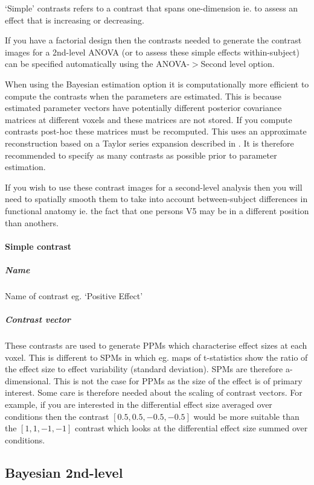 `Simple' contrasts refers to a contrast that spans one-dimension ie. to assess an effect that is increasing or decreasing.

If you have a factorial design then the contrasts needed to generate the contrast images for a 2nd-level ANOVA (or to assess these simple effects within-subject) can be specified automatically using the ANOVA-$>$Second level option.

When using the Bayesian estimation option it is computationally more efficient to compute the contrasts when the parameters are estimated. This is because estimated parameter vectors have potentially different posterior covariance matrices at different voxels and these matrices are not stored. If you compute contrasts post-hoc these matrices must be recomputed. This uses an approximate reconstruction based on a Taylor series expansion described in \cite{vb3}. It is therefore recommended to specify as many contrasts as possible prior to parameter estimation.

If you wish to use these contrast images for a second-level analysis then you will need to spatially smooth them to take into account between-subject differences in functional anatomy ie. the fact that one persons V5 may be in a different position than anothers. 

\paragraph{Simple contrast}

\subparagraph{Name}

Name of contrast eg. `Positive Effect'

\subparagraph{Contrast vector}

These contrasts are used to generate PPMs which characterise effect sizes at each voxel. This is different to SPMs in which eg. maps of t-statistics show the ratio of the effect size to effect variability (standard deviation). SPMs are therefore a-dimensional. This is not the case for PPMs as the size of the effect is of primary interest. Some care is therefore needed about the scaling of contrast vectors. For example, if you are interested in the differential effect size averaged over conditions then the contrast $[0.5, 0.5, -0.5, -0.5]$ would be more suitable than the $[1, 1, -1, -1]$ contrast which looks at the differential effect size summed over conditions. 

\subsection{Bayesian 2nd-level}

